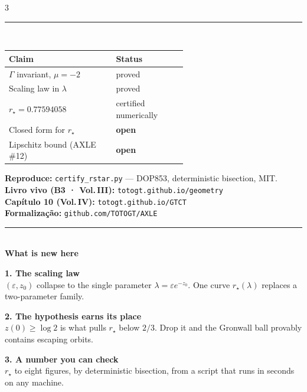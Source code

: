\documentclass[final]{article}
\newcommand{\Small}{\fontsize{22}{29}\selectfont}
\newcommand{\Head}[1]{%
  \vspace{7mm}{\fontsize{34}{40}\selectfont\bfseries\color{navy}#1}\\[-1mm]
  {\color{gold}\rule{\linewidth}{2.2pt}}\\[5mm]}
\begin{document}
\begin{multicols}{3}
\Head{Status of claims}
{\fontsize{25}{33}\selectfont
\begin{tabular}{@{}p{0.60\linewidth}l@{}}
\toprule
Claim & Status\\
\midrule
$\Gamma$ invariant, $\mu=-2$ & proved\\
Scaling law in $\lambda$ & proved\\
$r_\star = 0.77594058$ & certified numerically\\
Closed form for $r_\star$ & \textbf{open}\\
Lipschitz bound (AXLE \#12) & \textbf{open}\\
\bottomrule
\end{tabular}}
\vspace{5mm}

\Small
\textbf{Reproduce:} \texttt{certify\_rstar.py} — DOP853, deterministic bisection, MIT.\\[2mm]
\textbf{Livro vivo (B3 · Vol.\,III):} \texttt{totogt.github.io/geometry}\\[2mm]
\textbf{Capítulo 10 (Vol.\,IV):} \texttt{totogt.github.io/GTCT}\\[2mm]
\textbf{Formalização:} \texttt{github.com/TOTOGT/AXLE}

\end{multicols}

\vfill
{\color{gold}\rule{\linewidth}{3pt}}\\[7mm]
{\fontsize{34}{40}\selectfont\bfseries\color{navy}What is new here}\\[6mm]
\begin{minipage}[t]{0.305\linewidth}
  {\fontsize{26}{33}\selectfont\bfseries\color{gold}1. The scaling law}\\[3mm]
  {\fontsize{24}{31}\selectfont $(\varepsilon,z_0)$ collapse to the single parameter
  $\lambda = \varepsilon e^{-z_0}$. One curve $r_\star(\lambda)$ replaces a two-parameter family.}
\end{minipage}\hfill
\begin{minipage}[t]{0.305\linewidth}
  {\fontsize{26}{33}\selectfont\bfseries\color{gold}2. The hypothesis earns its place}\\[3mm]
  {\fontsize{24}{31}\selectfont $z(0)\ge\log 2$ is what pulls $r_\star$ below $2/3$. Drop it and the
  Gronwall ball provably contains escaping orbits.}
\end{minipage}\hfill
\begin{minipage}[t]{0.305\linewidth}
  {\fontsize{26}{33}\selectfont\bfseries\color{gold}3. A number you can check}\\[3mm]
  {\fontsize{24}{31}\selectfont $r_\star$ to eight figures, by deterministic bisection, from a script
  that runs in seconds on any machine.}
\end{minipage}
\end{document}
